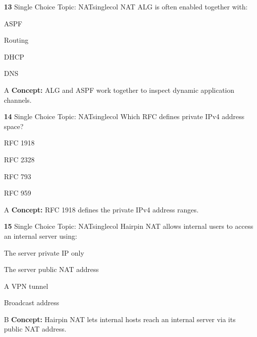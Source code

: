 \documentclass[10pt,a4paper]{article}
\begin{document}
\begin{qcard}{\color{white}\textbf{13} \hfill \small Single Choice \textbar{} Topic: NAT}{singlecol}
NAT ALG is often enabled together with:

\begin{qoptions}
\item ASPF
\item Routing
\item DHCP
\item DNS
\end{qoptions}
\begin{explainbox}{A}
\textbf{Concept:} ALG and ASPF work together to inspect dynamic application channels.
\end{explainbox}
\end{qcard}

\begin{qcard}{\color{white}\textbf{14} \hfill \small Single Choice \textbar{} Topic: NAT}{singlecol}
Which RFC defines private IPv4 address space?

\begin{qoptions}
\item RFC 1918
\item RFC 2328
\item RFC 793
\item RFC 959
\end{qoptions}
\begin{explainbox}{A}
\textbf{Concept:} RFC 1918 defines the private IPv4 address ranges.
\end{explainbox}
\end{qcard}

\begin{qcard}{\color{white}\textbf{15} \hfill \small Single Choice \textbar{} Topic: NAT}{singlecol}
Hairpin NAT allows internal users to access an internal server using:

\begin{qoptions}
\item The server private IP only
\item The server public NAT address
\item A VPN tunnel
\item Broadcast address
\end{qoptions}
\begin{explainbox}{B}
\textbf{Concept:} Hairpin NAT lets internal hosts reach an internal server via its public NAT address.
\end{explainbox}
\end{qcard}
\end{document}
